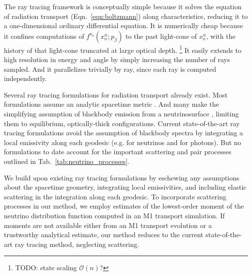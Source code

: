 \documentclass[aps,floatfix,prd,superscriptaddress,twocolumn]{revtex4-1}
\begin{document}
The ray tracing framework
is conceptually simple because it solves the equation of radiation
transport (Eqn.~\ref{eqn:boltzmann}) along characteristics,
reducing it to a one-dimensional ordinary differential equation.
It is numerically cheap because it confines computations of
$f^{\nu_\sigma}(x_o^\alpha;p_\beta)$ to the past light-cone of $x_o^\alpha$,
with the history of that light-cone truncated at large optical depth.
\footnote{TODO: state scaling $\mathscr{O}(n)$?}
It easily extends to high resolution in energy and angle by simply
increasing the number of rays sampled.
And it parallelizes trivially by ray, since each ray is computed
independently.

Several ray tracing formulations for radiation transport already exist.
Most formulations assume an analytic spacetime metric
\citep{birk2007-nunubar, caba2009-detecting_grb_nu,
  hari2010-gr_nunubar_collapsar, kova2011-gr_ray_tracing}.
And many make the simplifying assumption of blackbody emission from a
neutrinosurface
\citep{birk2007-nunubar, caba2009-detecting_grb_nu, kova2011-gr_ray_tracing},
limiting them to equilibrium, optically-thick configurations.
Current state-of-the-art ray tracing formulations avoid the assumption of
blackbody spectra by integrating a local emissivity along each geodesic
(e.g. \cite{hari2010-gr_nunubar_collapsar} for neutrinos and
\cite{youn2012-gr_radiative_transfer} for photons).
But no formulations to date account for the important scattering and pair
processes outlined in Tab.~\ref{tab:neutrino_processes}.

We build upon existing ray tracing formulations
by eschewing any assumptions about the spacetime geometry,
integrating local emissivities,
and including elastic scattering in the integration along each geodesic.
To incorporate scattering processes in our method, we employ estimates of the
lowest-order moment of the neutrino distribution function
computed in an M1 transport simulation.
If moments are not available either from
an M1 transport evolution or a trustworthy analytical estimate,
our method reduces to the current state-of-the-art ray tracing method,
neglecting scattering.
\end{document}
